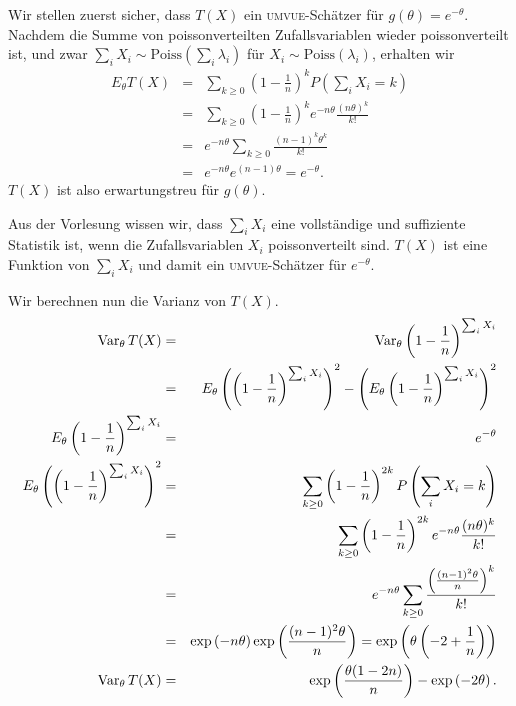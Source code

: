 \solution Wir stellen zuerst sicher, dass $T(X)$ ein
\textsc{umvue}-Schätzer für $g(\theta)=e^{-\theta}$. Nachdem die Summe von
poissonverteilten Zufallsvariablen wieder poissonverteilt ist, und zwar
$\sum_{i}^{} X_i \sim \textrm{Poiss}(\sum_{i}^{} \lambda_i)$ für $X_i \sim
\textrm{Poiss}(\lambda_i)$, erhalten wir
\begin{eqnarray*}
    E_\theta T(X) &=& \sum_{k\geq 0} \left( 1-\frac{1}{n} \right)^k P\left( \sum_{i}^{} X_i =k \right)\\
    &=& \sum_{k\geq 0}^{} \left( 1-\frac{1}{n} \right)^k e^{-n\theta} \frac{(n\theta)^k}{k!} \\
    &=& e^{-n\theta} \sum_{k\geq 0} \frac{ (n-1)^k\theta^k}{k!} \\
    &=& e^{-n \theta} e^{(n-1)\theta} = e^{-\theta}.
\end{eqnarray*}
$T(X)$ ist also erwartungstreu für $g(\theta)$.

Aus der Vorlesung wissen wir, dass $\sum_{i}^{} X_i$ eine vollständige und suffiziente
Statistik ist, wenn die Zufallsvariablen $X_i$ poissonverteilt sind. $T(X)$ ist 
eine Funktion von $\sum_{i}^{} X_i$ und damit ein \textsc{umvue}-Schätzer
für $e^{-\theta}$.

Wir berechnen nun die Varianz von $T(X)$.
\begin{eqnarray*}
    \operatorname{Var}_\theta T(X)&=& \operatorname{Var}_\theta \left( 1-\frac{1}{n} \right)^{\sum_{i} X_i} \\ 
    &=& E_\theta \left( \left( 1-\frac{1}{n} \right)^{\sum_{i} X_i} \right)^2 - \left( E_\theta \left( 1-\frac{1}{n} \right)^{\sum_{i} X_i} \right)^2 \\
    E_\theta \left( 1-\frac{1}{n} \right)^{\sum_{i} X_i} &=& e^{-\theta} \\
    E_\theta \left( \left( 1-\frac{1}{n} \right)^{\sum_{i} X_i} \right)^2 
    &=& \sum_{k\geq 0}^{} \left( 1-\frac{1}{n} \right)^{2k} P\left( \sum_{i}^{} X_i =k \right) \\
    &=& \sum_{k\geq 0}^{} \left( 1-\frac{1}{n} \right)^{2k} e^{-n\theta} \frac{(n\theta)^k}{k!} \\
    &=& e^{-n \theta} \sum_{k\geq 0} \frac{ \left( \frac{ (n-1)^2 \theta }{n} \right)^k   }{k!} \\
    &=& \exp\left( -n\theta \right) \exp\left( \frac{(n-1)^2\theta}{n} \right)
    = \exp\left( \theta\left( -2 + \frac{1}{n} \right) \right) \\
    \operatorname{Var}_\theta T(X) &=& \exp\left( \frac{\theta(1-2n)}{n} \right) - \exp\left( -2\theta \right). 
\end{eqnarray*}

